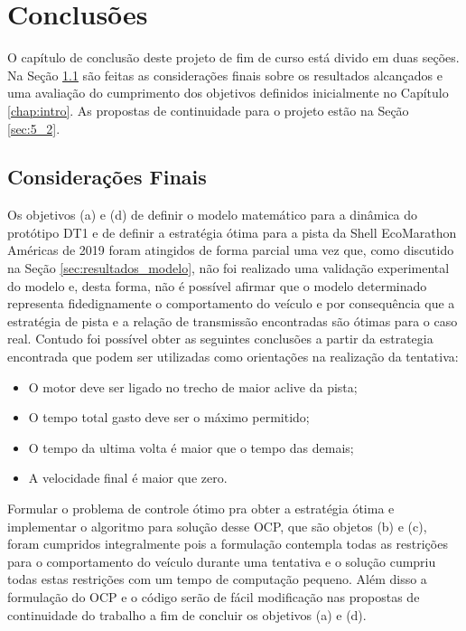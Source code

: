 \chapter{Conclusões}
\label{chap:conclusao}
\thispagestyle{empty}

O capítulo de conclusão deste projeto de fim de curso está divido em duas seções.
Na Seção \ref{sec:5_1} são feitas as considerações finais sobre os resultados alcançados e uma avaliação do cumprimento dos objetivos definidos inicialmente no Capítulo \ref{chap:intro}.
As propostas de continuidade para o projeto estão na Seção \ref{sec:5_2}.

\section{Considerações Finais}
\label{sec:5_1}

Os objetivos (a) e (d) de definir o modelo matemático para a dinâmica do protótipo DT1 e de definir a estratégia ótima para a pista da Shell EcoMarathon Américas de 2019 
foram atingidos de forma parcial uma vez que, como discutido na Seção \ref{sec:resultados_modelo}, não foi realizado uma validação experimental do modelo e, desta forma, não é possível afirmar que o modelo determinado representa fidedignamente o comportamento do veículo
e por consequência que a estratégia de pista e a relação de transmissão encontradas são ótimas para o caso real. Contudo foi possível obter as seguintes conclusões a partir da estrategia encontrada que 
podem ser utilizadas como orientações na realização da tentativa: 

\begin{itemize}
    \item O motor deve ser ligado no trecho de maior aclive da pista;
    \item O tempo total gasto deve ser o máximo permitido;
    \item O tempo da ultima volta é maior que o tempo das demais;
    \item A velocidade final é maior que zero.
\end{itemize}



Formular o problema de controle ótimo pra obter a estratégia ótima e implementar o algoritmo para solução desse OCP,
que são objetos (b) e (c), foram cumpridos integralmente pois a formulação contempla todas as restrições para o comportamento do veículo durante uma tentativa e o solução cumpriu todas estas
restrições com um tempo de computação pequeno. Além disso a formulação do OCP e o código serão de fácil modificação nas propostas de continuidade do trabalho
a fim de concluir os objetivos (a) e (d).

